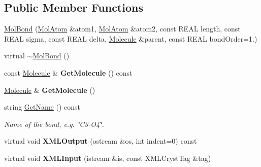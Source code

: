 \subsection*{Public Member Functions}
\begin{DoxyCompactItemize}
\item 
\mbox{\hyperlink{class_obj_cryst_1_1_mol_bond_aa5eb1a8ba4e34da2516bfc24af4fabec}{Mol\+Bond}} (\mbox{\hyperlink{class_obj_cryst_1_1_mol_atom}{Mol\+Atom}} \&atom1, \mbox{\hyperlink{class_obj_cryst_1_1_mol_atom}{Mol\+Atom}} \&atom2, const R\+E\+AL length, const R\+E\+AL sigma, const R\+E\+AL delta, \mbox{\hyperlink{class_obj_cryst_1_1_molecule}{Molecule}} \&parent, const R\+E\+AL bond\+Order=1.)
\item 
virtual \mbox{\hyperlink{class_obj_cryst_1_1_mol_bond_a2cf7c1c4da8cb4e802fbc9a2bed2eba7}{$\sim$\+Mol\+Bond}} ()
\item 
\mbox{\label{class_obj_cryst_1_1_mol_bond_a7b9849d66e696f84f695de39d1d0e8dc}} 
const \mbox{\hyperlink{class_obj_cryst_1_1_molecule}{Molecule}} \& {\bfseries Get\+Molecule} () const
\item 
\mbox{\label{class_obj_cryst_1_1_mol_bond_aa1ff21e762b0c46cd28d717619bc0e1e}} 
\mbox{\hyperlink{class_obj_cryst_1_1_molecule}{Molecule}} \& {\bfseries Get\+Molecule} ()
\item 
\mbox{\label{class_obj_cryst_1_1_mol_bond_aa2e55e0744234ef375f2b1e596270a03}} 
string \mbox{\hyperlink{class_obj_cryst_1_1_mol_bond_aa2e55e0744234ef375f2b1e596270a03}{Get\+Name}} () const
\begin{DoxyCompactList}\small\item\em Name of the bond, e.\+g. \char`\"{}\+C3-\/\+O4\char`\"{}. \end{DoxyCompactList}\item 
\mbox{\label{class_obj_cryst_1_1_mol_bond_aa78e51825d075d53fa6a4104a63f51eb}} 
virtual void {\bfseries X\+M\+L\+Output} (ostream \&os, int indent=0) const
\item 
\mbox{\label{class_obj_cryst_1_1_mol_bond_a890b0c90de24f4ac97f6ce4f7a9cd643}} 
virtual void {\bfseries X\+M\+L\+Input} (istream \&is, const X\+M\+L\+Cryst\+Tag \&tag)
\item 

\end{DoxyCompactItemize}
